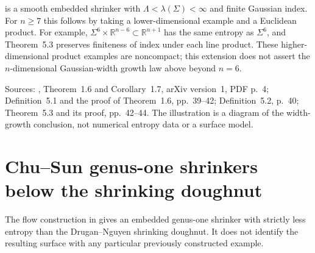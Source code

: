 \begin{example}
\begin{itemize}
is a smooth embedded shrinker with
$\Lambda<\lambda(\Sigma)<\infty$ and finite Gaussian index.
For $n\geq7$ this follows by taking a lower-dimensional example
and a Euclidean product. For example,
$\Sigma^6\times\mathbb R^{n-6}\subset\mathbb R^{n+1}$ has the
same entropy as $\Sigma^6$, and Theorem~5.3 preserves finiteness
of index under each line product. These higher-dimensional product
examples are noncompact; this extension does not assert the
$n$-dimensional Gaussian-width growth law above beyond $n=6$.
\end{itemize}
Sources: \cite{CatSunWangZhou2024}, Theorem~1.6 and Corollary~1.7,
arXiv version~1, PDF p.~4; Definition~5.1 and the proof of
Theorem~1.6, pp.~39--42; Definition~5.2, p.~40;
Theorem~5.3 and its proof, pp.~42--44. The illustration is a diagram of the
width-growth conclusion, not numerical entropy data or a surface model.
\end{example}

\chapter{Chu--Sun genus-one shrinkers below the shrinking doughnut}\label{sec:catalogue-chu-sun-genus-one}
The flow construction in \cite{CatChuSun2025} gives an embedded
genus-one shrinker with strictly less entropy than the
Drugan--Nguyen shrinking doughnut. It does not identify the
resulting surface with any particular previously constructed example.


